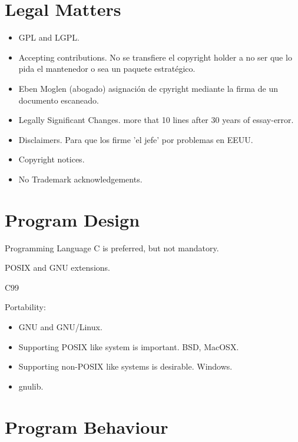 \documentclass[11pt]{scrartcl}
\begin{document}

\section{Legal Matters}
\label{sec:legal}

\begin{itemize}
	\item GPL and LGPL.
	\item Accepting contributions. No se transfiere el copyright holder a no ser que lo pida el mantenedor o sea un paquete estrat\'egico.
	\item Eben Moglen (abogado) asignaci\'on de cpyright mediante la firma de un documento escaneado.
	\item Legally Significant Changes. more that 10 lines after 30 years of essay-error.
	\item Disclaimers. Para que los firme 'el jefe' por problemas en EEUU.
	\item Copyright notices.
	\item No Trademark acknowledgements.
\end{itemize}


\section{Program Design}
\label{sec:progam-design}

\par Programming Language C is preferred, but not mandatory.

\par POSIX and GNU extensions.

\par C99

\par Portability: 
\begin{itemize}
	\item GNU and GNU/Linux.
	\item Supporting POSIX like system is important. BSD, MacOSX.
	\item Supporting non-POSIX like systems is desirable. Windows.
	\item gnulib.
\end{itemize}


\section{Program Behaviour}
\label{sec:behaviour}
\end{document}
